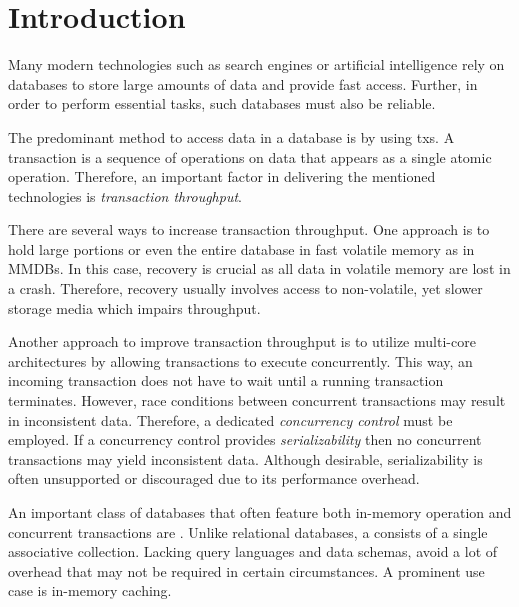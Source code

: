 \chapter{Introduction}
\label{ch:intro}




Many modern technologies such as search engines or artificial intelligence rely
on databases to store large amounts of data and provide fast access. Further, in
order to perform essential tasks, such databases must also be reliable.

The predominant method to access data in a database is by using \glspl{tx}. A
transaction is a sequence of operations on data that appears as a single atomic
operation. Therefore, an important factor in delivering the mentioned
technologies is \emph{transaction throughput}.

There are several ways to increase transaction throughput. One approach is to
hold large portions or even the entire database in fast volatile memory as in
\acp{MMDB}. In this case, recovery is crucial as all data in volatile memory are
lost in a crash. Therefore, recovery usually involves access to non-volatile,
yet slower storage media which impairs throughput.

Another approach to improve transaction throughput is to utilize multi-core
architectures by allowing transactions to execute concurrently. This way, an
incoming transaction does not have to wait until a running transaction
terminates. However, race conditions between concurrent transactions may result
in inconsistent data. Therefore, a dedicated \emph{concurrency control} must be
employed. If a concurrency control provides \emph{serializability} then no
concurrent transactions may yield inconsistent data. Although desirable,
serializability is often unsupported or discouraged due to its performance
overhead.

An important class of databases that often feature both in-memory operation and
concurrent transactions are \emph{\kvsp}. Unlike relational databases, a \kvs
consists of a single associative collection. Lacking query languages and data
schemas, \kvsp avoid a lot of overhead that may not be required in certain
circumstances. A prominent use case is in-memory caching.

